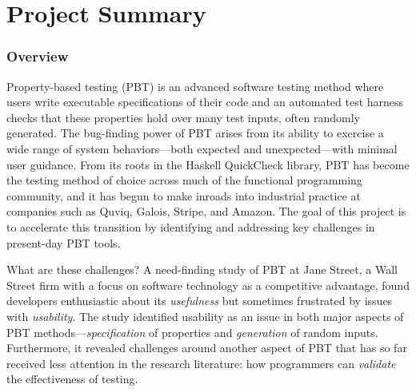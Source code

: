 \section*{Project Summary}

\subsubsection*{Overview}
Property-based testing (PBT) is an advanced software testing
method where users write executable specifications of their code
and an automated test harness checks that these properties hold over
many test inputs, often randomly generated.  The bug-finding power of PBT arises
from its ability to exercise a wide range of system behaviors---both
expected and unexpected---with minimal user guidance.
%
From its roots in the Haskell QuickCheck library, PBT has become
the testing method of choice across much of the functional programming
community, and it has begun to make inroads into industrial practice
at companies such as Quviq, Galois, Stripe, and Amazon.\iflater{}\fi{}
%
The goal of this project is to accelerate this transition
by identifying and addressing key challenges in
present-day PBT tools.

What are these challenges?
A need-finding study of PBT at Jane
Street, a Wall Street firm with a focus on software
technology as a competitive advantage, found developers enthusiastic
about its {\em usefulness} but
sometimes frustrated by issues with {\em usability}.
%
The study identified usability as an issue in both major aspects
of PBT methods---{\em specification} of properties and {\em
  generation} of random inputs. Furthermore, it revealed challenges
around another aspect of PBT that has so far received less attention in the
research literature: how programmers can {\em validate} the
effectiveness of testing.


